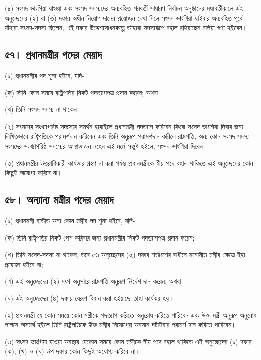 \documentclass[11pt]{article}
\begin{document}
(৪) সংসদ ভাংগিয়া যাওয়া এবং সংসদ-সদস্যদের অব্যবহিত পরবর্তী সাধারণ নির্বাচন
    অনুষ্ঠানের মধ্যবর্তীকালে এই অনুচ্ছেদের (২) বা (৩) দফার অধীন নিয়োগ দানের
    প্রয়োজন দেখা দিলে সংসদ ভাংগিয়া যাইবার অব্যবহিত পূর্বে যাঁহারা সংসদ-সদস্য
    ছিলেন, এই দফার উদ্দেশ্যসাধনকল্পে তাঁহারা সদস্যরূপে বহাল রহিয়াছেন বলিয়া গণ্য
    হইবেন।

\subsection{৫৭। প্রধানমন্ত্রীর পদের মেয়াদ}
\label{sec:orga4725e6}
(১) প্রধানমন্ত্রীর পদ শূন্য হইবে, যদি-

(ক) তিনি কোন সময়ে রাষ্ট্রপতির নিকট পদত্যাগপত্র প্রদান করেন; অথবা

(খ) তিনি সংসদ-সদস্য না থাকেন।

(২) সংসদের সংখ্যাগরিষ্ঠ সদস্যের সমর্থন হারাইলে প্রধানমন্ত্রী পদত্যাগ করিবেন
    কিংবা সংসদ ভাংগিয়া দিবার জন্য লিখিতভাবে রাষ্ট্রপতিকে পরামর্শদান করিবেন এবং
    তিনি অনুরূপ পরামর্শদান করিলে রাষ্ট্রপতি, অন্য কোন সংসদ-সদস্য সংসদের
    সংখ্যাগরিষ্ঠ সদস্যের আস্থাভাজন নহেন এই মর্মে সন্তুষ্ট হইলে, সংসদ ভাংগিয়া
    দিবেন।

(৩) প্রধানমন্ত্রীর উত্তরাধিকারী কার্যভার গ্রহণ না করা পর্যন্ত প্রধানমন্ত্রীকে
    স্বীয় পদে বহাল থাকিতে এই অনুচ্ছেদের কোন কিছুই অযোগ্য করিবে না।

\subsection{৫৮। অন্যান্য মন্ত্রীর পদের মেয়াদ}
\label{sec:org760dad2}
(১) প্রধানমন্ত্রী ব্যতীত অন্য কোন মন্ত্রীর পদ শূন্য হইবে, যদি-

(ক) তিনি রাষ্ট্রপতির নিকট পেশ করিবার জন্য প্রধানমন্ত্রীর নিকট পদত্যাগপত্র
    প্রদান করেন;

(খ) তিনি সংসদ-সদস্য না থাকেন, তবে ৫৬ অনুচ্ছেদের (২) দফার শর্তাংশের অধীনে
    মনোনীত মন্ত্রীর ক্ষেত্রে ইহা প্রযোজ্য হইবে না;

(গ) এই অনুচ্ছেদের (২) দফা অনুসারে রাষ্ট্রপতি অনুরূপ নির্দেশ দান করেন; অথবা

(ঘ) এই অনুচ্ছেদের (৪) দফায় যেরূপ বিধান করা হইয়াছে তাহা কার্যকর হয়।

(২) প্রধানমন্ত্রী যে কোন সময়ে কোন মন্ত্রীকে পদত্যাগ করিতে অনুরোধ করিতে
    পারিবেন এবং উক্ত মন্ত্রী অনুরূপ অনুরোধ পালনে অসমর্থ হইলে তিনি রাষ্ট্রপতিকে উক্ত
    মন্ত্রীর নিয়োগের অবসান ঘটাইবার পরামর্শ দান করিতে পারিবেন।

(৩) সংসদ ভাংগিয়া যাওয়া অবস্থায় যেকোন সময়ে কোন মন্ত্রীকে স্বীয় পদে বহাল
    থাকিতে এই অনুচ্ছেদের (১) দফার (ক), (খ) ও (ঘ) উপ-দফার কোন কিছুই অযোগ্য
    করিবে না।
\end{document}
